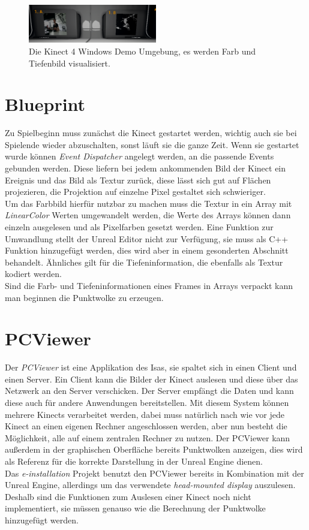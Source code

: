 \documentclass[a4paper]{IEEEtran}
\begin{document}
	\begin{figure}[!h]
    	\centering
		\includegraphics[width=0.5\textwidth]{img/Kinect4Windows}
	    \caption{Die Kinect 4 Windows Demo Umgebung, es werden Farb und Tiefenbild visualisiert.}
    	\label{Kinect4Windows}
	\end{figure}

\section{Blueprint}
	Zu Spielbeginn muss zunächst die Kinect gestartet werden, wichtig auch sie bei Spielende wieder abzuschalten, sonst läuft sie die ganze Zeit. 
	Wenn sie gestartet wurde können {\textit{Event Dispatcher}} angelegt werden, an die passende Events gebunden werden. 
	Diese liefern bei jedem ankommenden Bild der Kinect ein Ereignis und das Bild als Textur zurück, diese lässt sich gut auf Flächen projezieren, die Projektion auf einzelne Pixel gestaltet sich schwieriger. \\
	Um das Farbbild hierfür nutzbar zu machen muss die Textur in ein Array mit {\textit{LinearColor}} Werten umgewandelt werden, die Werte des Arrays können dann einzeln ausgelesen und als Pixelfarben gesetzt werden. 
	Eine Funktion zur Umwandlung stellt der Unreal Editor nicht zur Verfügung, sie muss als C++ Funktion hinzugefügt werden, dies wird aber in einem gesonderten Abschnitt behandelt. Ähnliches gilt für die Tiefeninformation, die ebenfalls als Textur kodiert werden. \\
	Sind die Farb- und Tiefeninformationen eines Frames in Arrays verpackt kann man beginnen die Punktwolke zu erzeugen.

\section{PCViewer}
	Der {\textit{PCViewer}} ist eine Applikation des Isas, sie spaltet sich in einen Client und einen Server. 
	Ein Client kann die Bilder der Kinect auslesen und diese über das Netzwerk an den Server verschicken. 
	Der Server empfängt die Daten und kann diese auch für andere Anwendungen bereitstellen.
	Mit diesem System können mehrere Kinects verarbeitet werden, dabei muss natürlich nach wie vor jede Kinect an einen eigenen Rechner angeschlossen werden, aber nun besteht die Möglichkeit, alle auf einem zentralen Rechner zu nutzen.
	Der PCViewer kann außerdem in der graphischen Oberfläche bereits Punktwolken anzeigen, dies wird als Referenz für die korrekte Darstellung in der Unreal Engine dienen. \\
	Das {\textit{e-installation}} Projekt benutzt den PCViewer bereits in Kombination mit der Unreal Engine, allerdings um das verwendete {\textit{head-mounted display}} auszulesen. 
	Deshalb sind die Funktionen zum Auslesen einer Kinect noch nicht implementiert, sie müssen genauso wie die Berechnung der Punktwolke hinzugefügt werden. \\[0.5cm]
	
\end{document}
